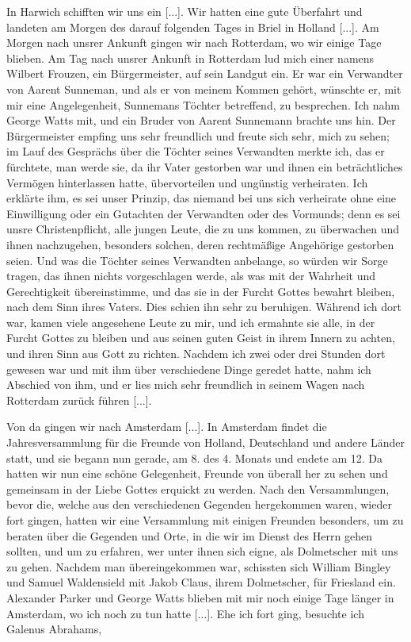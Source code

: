 In Harwich schifften wir uns ein [...]. Wir hatten eine gute
Überfahrt und landeten am Morgen des darauf folgenden Tages
in Briel in Holland [...]. Am Morgen nach unsrer Ankunft
gingen wir nach Rotterdam, wo wir einige Tage blieben. Am
Tag nach unsrer Ankunft in Rotterdam lud mich einer namens
Wilbert Frouzen, ein Bürgermeister, auf sein Landgut ein. Er
war ein Verwandter von Aarent Sunneman, und als er von
meinem Kommen gehört, wünschte er, mit mir eine Angelegenheit,
Sunnemans Töchter betreffend, zu besprechen. Ich nahm George
Watts mit, und ein Bruder von Aarent Sunnemann brachte uns
hin. Der Bürgermeister empfing uns sehr freundlich und freute
sich sehr, mich zu sehen; im Lauf des Gesprächs über die Töchter
seines Verwandten merkte ich, das er fürchtete, man werde sie,
da ihr Vater gestorben war und ihnen ein beträchtliches Vermögen
hinterlassen hatte, übervorteilen und ungünstig verheiraten. Ich 
erklärte ihm, es sei unser Prinzip, das niemand bei uns sich 
verheirate ohne eine Einwilligung oder ein Gutachten der Verwandten
oder des Vormunds; denn es sei unsre Christenpflicht, alle jungen
Leute, die zu uns kommen, zu überwachen und ihnen nachzugehen,
besonders solchen, deren rechtmäßige Angehörige gestorben seien.
Und was die Töchter seines Verwandten anbelange, so würden
wir Sorge tragen, das ihnen nichts vorgeschlagen werde, als was
mit der Wahrheit und Gerechtigkeit übereinstimme, und das sie
in der Furcht Gottes bewahrt bleiben, nach dem Sinn ihres
Vaters. Dies schien ihn sehr zu beruhigen. Während ich dort
war, kamen viele angesehene Leute zu mir, und ich ermahnte sie
alle, in der Furcht Gottes zu bleiben und aus seinen guten Geist
in ihrem Innern zu achten, und ihren Sinn aus Gott zu richten.
Nachdem ich zwei oder drei Stunden dort gewesen war und mit
ihm über verschiedene Dinge geredet hatte, nahm ich Abschied von
ihm, und er lies mich sehr freundlich in seinem Wagen nach
Rotterdam zurück führen [...].

Von da gingen wir nach Amsterdam [...]. In Amsterdam
findet die Jahresversammlung für die Freunde von Holland,
Deutschland und andere Länder statt, und sie begann nun gerade,
am 8. des 4. Monats und endete am 12. Da hatten wir nun
eine schöne Gelegenheit, Freunde von überall her zu sehen und
gemeinsam in der Liebe Gottes erquickt zu werden. Nach den
Versammlungen, bevor die, welche aus den verschiedenen Gegenden
hergekommen waren, wieder fort gingen, hatten wir eine 
Versammlung mit einigen Freunden besonders, um zu beraten über
die Gegenden und Orte, in die wir im Dienst des Herrn gehen
sollten, und um zu erfahren, wer unter ihnen sich eigne, als 
Dolmetscher mit uns zu gehen. Nachdem man übereingekommen war,
schissten sich William Bingley und Samuel 
Waldensield mit Jakob
Claus, ihrem Dolmetscher, für Friesland ein.
Alexander Parker und George Watts blieben mit mir
noch einige Tage länger in Amsterdam, wo ich noch zu tun
hatte [...]. Ehe ich fort ging, besuchte ich Galenus 
Abrahams,